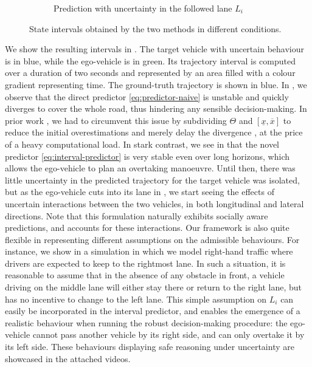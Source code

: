 \begin{figure}
\begin{center}
\begin{subfigure}[b]{0.75\linewidth}
		\caption{Prediction with uncertainty in the followed lane $L_i$}
		\label{sub:hw-d}
	\end{subfigure}
	\end{center}
	\caption{State intervals obtained by the two methods in different conditions.}
	\label{fig:highway}
\end{figure}


We show the resulting intervals in . The target vehicle with uncertain behaviour is in blue, while the ego-vehicle is in green. Its trajectory interval is computed over a duration of two seconds and represented by an area filled with a colour gradient representing time. The ground-truth trajectory is shown in blue. In , we observe that the direct predictor \eqref{eq:predictor-naive} is unstable and quickly diverges to cover the whole road, thus hindering any sensible decision-making. In prior work \citep{Leurent2018approximate}, we had to circumvent this issue by subdividing $\Theta$ and $[\underline{x}, \overline{x}]$ to reduce the initial overestimations and merely delay the divergence \citep{Adrot2003}, at the price of a heavy computational load. In stark contrast, we see in  that the novel predictor \eqref{eq:interval-predictor} is very stable even over long horizons, which allows the ego-vehicle to plan an overtaking manoeuvre. Until then, there was little uncertainty in the predicted trajectory for the target vehicle was isolated, but as the ego-vehicle cuts into its lane in , we start seeing the effects of uncertain interactions between the two vehicles, in both longitudinal and lateral directions. Note that this formulation naturally exhibits socially aware predictions, and accounts for these interactions. Our framework is also quite flexible in representing different assumptions on the admissible behaviours. For instance, we show in  a simulation in which we model right-hand traffic where drivers are expected to keep to the rightmost lane. In such a situation, it is reasonable to assume that in the absence of any obstacle in front, a vehicle driving on the middle lane will either stay there or return to the right lane, but has no incentive to change to the left lane. This simple assumption on $L_i$ can easily be incorporated in the interval predictor, and enables the emergence of a realistic behaviour when running the robust decision-making procedure: the ego-vehicle cannot pass another vehicle by its right side, and can only overtake it by its left side. These behaviours displaying safe reasoning under uncertainty are showcased in the attached videos.

